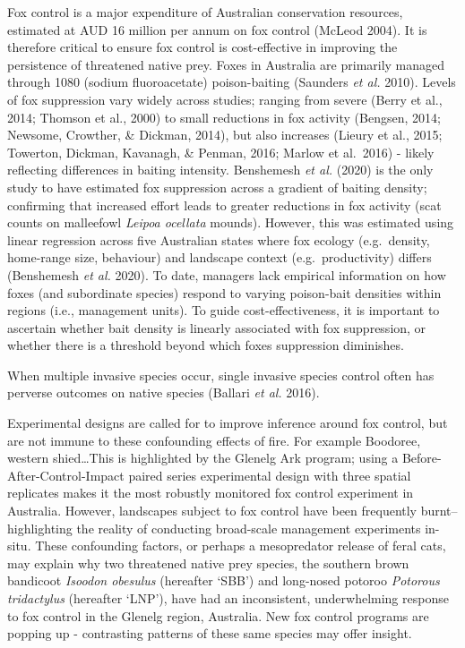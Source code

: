 \documentclass[11pt,a4paper,titlepage,twoside,openright]{style/unimelbthesis}
\begin{document}
\begin{mainmatter}
Fox control is a major expenditure of Australian conservation resources, estimated at AUD 16 million per annum on fox control (McLeod 2004). It is therefore critical to ensure fox control is cost-effective in improving the persistence of threatened native prey. Foxes in Australia are primarily managed through 1080 (sodium fluoroacetate) poison-baiting (Saunders \emph{et al.} 2010). Levels of fox suppression vary widely across studies; ranging from severe (Berry et al., 2014; Thomson et al., 2000) to small reductions in fox activity (Bengsen, 2014; Newsome, Crowther, \& Dickman, 2014), but also increases (Lieury et al., 2015; Towerton, Dickman, Kavanagh, \& Penman, 2016; Marlow et al.~2016) - likely reflecting differences in baiting intensity. Benshemesh \emph{et al.} (2020) is the only study to have estimated fox suppression across a gradient of baiting density; confirming that increased effort leads to greater reductions in fox activity (scat counts on malleefowl \emph{Leipoa ocellata} mounds). However, this was estimated using linear regression across five Australian states where fox ecology (e.g.~density, home-range size, behaviour) and landscape context (e.g.~productivity) differs (Benshemesh \emph{et al.} 2020). To date, managers lack empirical information on how foxes (and subordinate species) respond to varying poison-bait densities within regions (i.e., management units). To guide cost-effectiveness, it is important to ascertain whether bait density is linearly associated with fox suppression, or whether there is a threshold beyond which foxes suppression diminishes.

When multiple invasive species occur, single invasive species control often has perverse outcomes on native species (Ballari \emph{et al.} 2016).

Experimental designs are called for to improve inference around fox control, but are not immune to these confounding effects of fire. For example Boodoree, western shied\ldots This is highlighted by the Glenelg Ark program; using a Before-After-Control-Impact paired series experimental design with three spatial replicates makes it the most robustly monitored fox control experiment in Australia. However, landscapes subject to fox control have been frequently burnt-- highlighting the reality of conducting broad-scale management experiments in-situ. These confounding factors, or perhaps a mesopredator release of feral cats, may explain why two threatened native prey species, the southern brown bandicoot \emph{Isoodon obesulus} (hereafter `SBB') and long-nosed potoroo \emph{Potorous tridactylus} (hereafter `LNP'), have had an inconsistent, underwhelming response to fox control in the Glenelg region, Australia. New fox control programs are popping up - contrasting patterns of these same species may offer insight.


\end{mainmatter}
\end{document}

